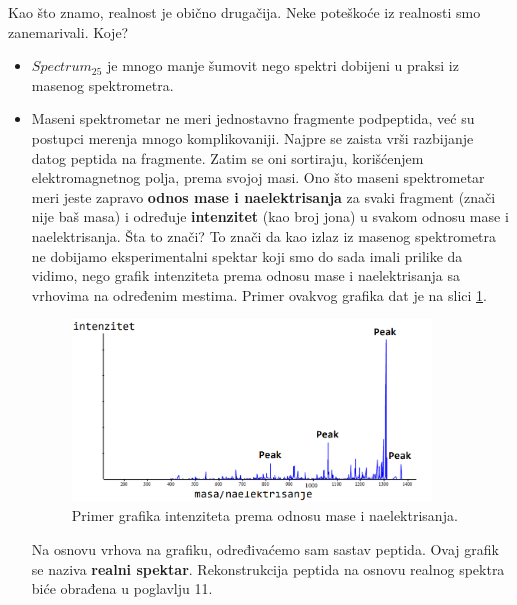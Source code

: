 Kao što znamo, realnost je obično drugačija. Neke poteškoće iz realnosti smo zanemarivali. Koje?
\begin{itemize}
	\item $Spectrum_{25}$ je mnogo manje šumovit nego spektri dobijeni u praksi iz masenog spektrometra.
	
	\item Maseni spektrometar ne meri jednostavno fragmente podpeptida, već su postupci merenja mnogo komplikovaniji. Najpre se zaista vrši razbijanje datog peptida na fragmente. Zatim se oni sortiraju, korišćenjem elektromagnetnog polja, prema svojoj masi. Ono što maseni spektrometar meri jeste zapravo \textbf{odnos mase i naelektrisanja} za svaki fragment (znači nije baš masa) i određuje \textbf{intenzitet} (kao broj jona) u svakom odnosu mase i naelektrisanja. Šta to znači? To znači da kao izlaz iz masenog spektrometra ne dobijamo eksperimentalni spektar koji smo do sada imali prilike da vidimo, nego grafik intenziteta prema odnosu mase i naelektrisanja sa vrhovima na određenim mestima. Primer ovakvog grafika dat je na slici \ref{slika:intenzitet}.
	\begin{figure}[h!]
	\centering
	\includegraphics[width=0.9\textwidth]{poglavlja/4/slike/intenzitet.png}
	\caption{Primer grafika intenziteta prema odnosu mase i naelektrisanja.}
	\label{slika:intenzitet}
\end{figure}
	Na osnovu vrhova na grafiku, određivaćemo sam sastav peptida. Ovaj grafik se naziva \textbf{realni spektar}. Rekonstrukcija peptida na osnovu realnog spektra biće obrađena u poglavlju 11.
	
\end{itemize}
